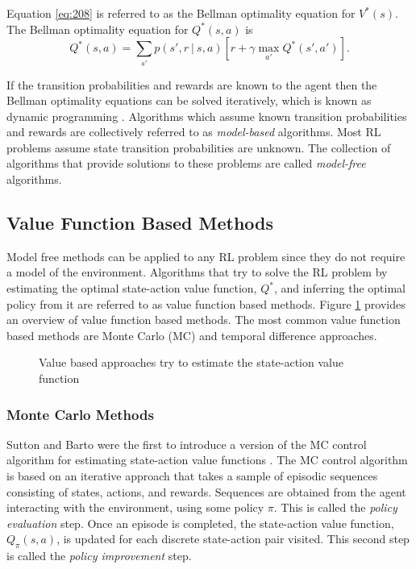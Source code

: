 Equation \ref{eq:208} is referred to as the Bellman optimality equation for $V^*(s)$. The Bellman optimality equation for $Q^*(s,a)$ is
\begin{equation}
	Q^*(s,a) = \sum_{s'} p(s', r \ | \ s, a)[r + \gamma \max_{a'} Q^*(s',a')]. \label{eq:209}
\end{equation}

If the transition probabilities and rewards are known to the agent then the Bellman optimality equations can be solved iteratively, which is known as dynamic programming \cite{Bellm1957}. Algorithms which assume known transition probabilities and rewards are collectively referred to as \textit{model-based} algorithms. Most RL problems assume state transition probabilities are unknown. The collection of algorithms that provide solutions to these problems are called \textit{model-free} algorithms.


\subsection{Value Function Based Methods}\label{sec:value_function_method}
Model free methods can be applied to any RL problem since they do not require a model of the environment. Algorithms that try to solve the RL problem by estimating the optimal state-action value function, $Q^*$, and inferring the optimal policy from it are referred to as value function based methods. Figure \ref{fig:211_families_of_RL_algorithms} provides an overview of value function based methods. The most common value function based methods are Monte Carlo (MC) and temporal difference approaches.

\begin{figure}[h]
	\centering
	\resizebox{\textwidth}{!}{}
	\caption[RL approaches: Value Based]{Value based approaches try to estimate the state-action value function}
	\label{fig:211_families_of_RL_algorithms}
\end{figure}


\subsubsection{Monte Carlo Methods}
Sutton and Barto were the first to introduce a version of the MC control algorithm for estimating state-action value functions \cite{Sutton2018}. The MC control algorithm is based on an iterative approach that takes a sample of episodic sequences consisting of states, actions, and rewards. Sequences are obtained from the agent interacting with the environment, using some policy $\pi$. This is called the \textit{policy evaluation} step. Once an episode is completed, the state-action value function, $Q_{\pi}(s,a)$, is updated for each discrete state-action pair visited. This second step is called the \textit{policy improvement} step.

